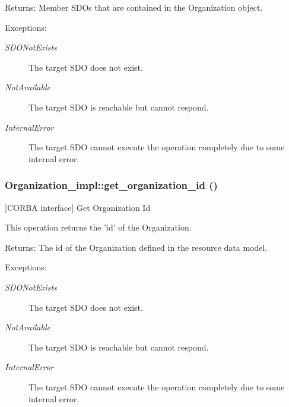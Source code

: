 \begin{Desc}
\item[Returns:]Member SDOs that are contained in the Organization object. \end{Desc}
\begin{Desc}
\item[Exceptions:]
\begin{description}
\item[{\em SDONot\-Exists}]The target SDO does not exist. \item[{\em Not\-Available}]The target SDO is reachable but cannot respond. \item[{\em Internal\-Error}]The target SDO cannot execute the operation completely due to some internal error.\end{description}
\end{Desc}
\subsubsection{\setlength{\rightskip}{0pt plus 5cm}Organization\_\-impl::get\_\-organization\_\-id ()}\label{classOrganization__impl_Organization__impla0}


[CORBA interface] Get Organization Id 

This operation returns the 'id' of the Organization.

\begin{Desc}
\item[Returns:]The id of the Organization defined in the resource data model. \end{Desc}
\begin{Desc}
\item[Exceptions:]
\begin{description}
\item[{\em SDONot\-Exists}]The target SDO does not exist. \item[{\em Not\-Available}]The target SDO is reachable but cannot respond. \item[{\em Internal\-Error}]The target SDO cannot execute the operation completely due to some internal error.\end{description}
\end{Desc}
